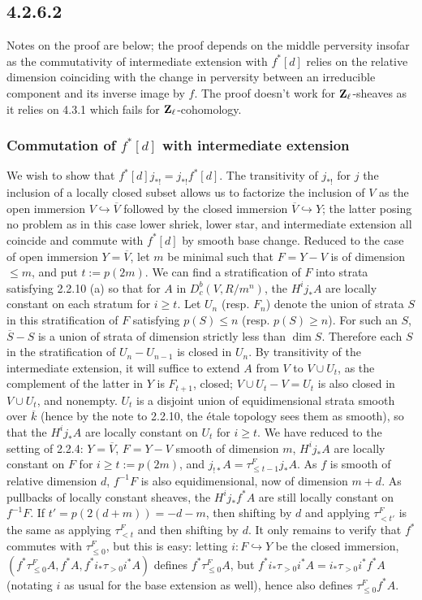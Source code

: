 \documentclass[deligne.tex]{subfiles}
\begin{document}
\subsection*{4.2.6.2}
Notes on the proof are below; the proof depends on the middle perversity
insofar as the commutativity of intermediate extension with $f^*[d]$ relies
on the relative dimension coinciding with the change in perversity
between an irreducible component and its inverse image by $f$.
The proof doesn't work for $\mathbf{Z}_\ell$-sheaves as it relies on 4.3.1 which
fails for $\mathbf{Z}_\ell$-cohomology.

\subsubsection*{Commutation of $f^*[d]$ with intermediate extension}
We wish to show that $f^*[d]j_{*!}=j_{*!}f^*[d]$.
The transitivity of $j_{*!}$ for $j$ the inclusion of a locally closed
subset allows us to factorize the inclusion of $V$ as the open immersion
$V\hookrightarrow\overline V$ followed by the closed immersion
$\overline V\hookrightarrow Y$; the latter posing no problem as in this case
lower shriek, lower star, and intermediate extension all coincide and 
commute with $f^*[d]$ by smooth base change. Reduced to the case
of open immersion $Y=\overline V$, let $m$ be minimal such that $F=Y-V$ is
of dimension $\leq m$, and put $t:=p(2m)$. We can find a stratification of
$F$ into strata satisfying 2.2.10 (a) so that for
$A$ in $D_c^b(V,R/m^n)$, the $H^ij_*A$ are locally constant on each stratum for $i\geq t$. Let $U_n$ (resp. $F_n$) denote the
union of strata $S$ in this stratification of $F$ satisfying $p(S)\leq n$
(resp. $p(S)\geq n$).
For such an $S$, $\overline S-S$ is a union of strata of dimension strictly 
less than $\dim S$. Therefore each $S$ in the stratification of
$U_n-U_{n-1}$ is closed in $U_n$. By transitivity of the intermediate
extension, it will suffice to extend $A$ from $V$ to $V\cup U_t$,
as the complement of the latter in $Y$ is $F_{t+1}$, closed;
$V\cup U_t-V=U_t$ is also closed in $V\cup U_t$, and nonempty.
$U_t$ is a disjoint union of equidimensional strata smooth over $\overline k$
(hence by the note to 2.2.10, the étale topology sees them as smooth),
so that the $H^ij_*A$ are locally constant on $U_t$ for $i\geq t$.
We have reduced to the setting of 2.2.4: $Y=\overline V$, $F=Y-V$
smooth of dimension $m$, $H^ij_*A$ are locally constant on $F$ for
$i\geq t:=p(2m)$, and $j_{!*}A=\tau_{\leq t-1}^Fj_*A$.
As $f$ is smooth of relative dimension $d$, $f^{-1}F$ is also 
equidimensional, now of dimension $m+d$. As pullbacks of locally constant
sheaves, the $H^ij_*f^*A$ are still locally constant on $f^{-1}F$.
If $t'=p(2(d+m))=-d-m$, then shifting by $d$ and applying $\tau^F_{<t'}$ is
the same as applying $\tau^F_{<t}$ and then shifting by $d$. It only remains
to verify that $f^*$ commutes with $\tau^F_{\leq0}$, but this is easy:
letting $i:F\hookrightarrow Y$ be the closed immersion,
$(f^*\tau^F_{\leq 0}A,f^*A,f^*i_*\tau_{>0}i^*A)$ defines
$f^*\tau^F_{\leq0}A$, but $f^*i_*\tau_{>0}i^*A=i_*\tau_{>0}i^*f^*A$
(notating $i$ as usual for the base extension as well), hence also
defines $\tau_{\leq0}^Ff^*A$.
\end{document}
